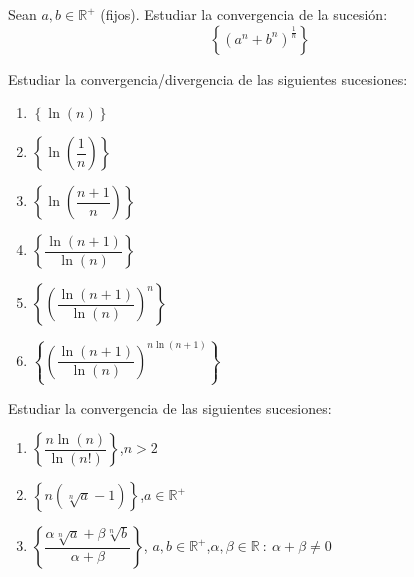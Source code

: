 \begin{ejercicio}
    Sean $a,b \in \mathbb{R}^+$ (fijos). Estudiar la convergencia de la sucesión:
    \begin{equation*}
        \left\{ (a^n + b^n)^\frac{1}{n} \right\}
    \end{equation*}
\end{ejercicio}

\begin{ejercicio}
    Estudiar la convergencia/divergencia de las siguientes sucesiones:
    \begin{enumerate}
        \item $\left\{\ln(n)\right\}$
        \item $\left\{\ln(\dfrac{1}{n})\right\}$
        \item $\left\{\ln(\dfrac{n+1}{n})\right\}$
        \item $\left\{\dfrac{\ln(n+1)}{\ln(n)}\right\}$
        \item $\left\{ \left(\dfrac{\ln(n+1)}{\ln(n)}\right)^n\right\}$
        \item $\left\{ \left(\dfrac{\ln(n+1)}{\ln(n)}\right)^{n \ln(n+1)}\right\}$
    \end{enumerate}
\end{ejercicio}

\begin{ejercicio}
    Estudiar la convergencia de las siguientes sucesiones:
    \begin{enumerate}
        \item $\left\{ \dfrac{n \ln(n)}{\ln(n!)} \right\}$,\quad $n >2$
        \item $\left\{ n (\sqrt[n]{a}-1) \right\}$,\quad $a \in \mathbb{R}^+$
        \item $\left\{ \dfrac{\alpha \sqrt[n]{a} + \beta \sqrt[n]{b}}{\alpha + \beta} \right\}$, 
        \quad$a,b \in \mathbb{R}^+$,\quad $\alpha, \beta \in \mathbb{R} ~:~ \alpha + \beta \neq 0$
    \end{enumerate}
\end{ejercicio}